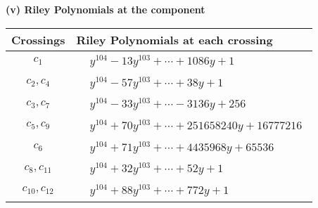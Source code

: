 \documentclass[1p]{elsarticle_modified}
\theoremstyle{definition}
\begin{document}
\flushleft \textbf{(v) Riley Polynomials at the component}\newline \\
\begin{tabular}{m{50pt}|m{274pt}}
Crossings & \hspace{64pt}Riley Polynomials at each crossing \\
\hline $$\begin{aligned}c_{1}\end{aligned}$$&$\begin{aligned}
&y^{104}-13 y^{103}+\cdots+1086 y+1
\end{aligned}$\\
\hline $$\begin{aligned}c_{2},c_{4}\end{aligned}$$&$\begin{aligned}
&y^{104}-57 y^{103}+\cdots+38 y+1
\end{aligned}$\\
\hline $$\begin{aligned}c_{3},c_{7}\end{aligned}$$&$\begin{aligned}
&y^{104}-33 y^{103}+\cdots-3136 y+256
\end{aligned}$\\
\hline $$\begin{aligned}c_{5},c_{9}\end{aligned}$$&$\begin{aligned}
&y^{104}+70 y^{103}+\cdots+251658240 y+16777216
\end{aligned}$\\
\hline $$\begin{aligned}c_{6}\end{aligned}$$&$\begin{aligned}
&y^{104}+71 y^{103}+\cdots+4435968 y+65536
\end{aligned}$\\
\hline $$\begin{aligned}c_{8},c_{11}\end{aligned}$$&$\begin{aligned}
&y^{104}+32 y^{103}+\cdots+52 y+1
\end{aligned}$\\
\hline $$\begin{aligned}c_{10},c_{12}\end{aligned}$$&$\begin{aligned}
&y^{104}+88 y^{103}+\cdots+772 y+1
\end{aligned}$\\
\hline
\end{tabular}\\~\\
\end{document}
